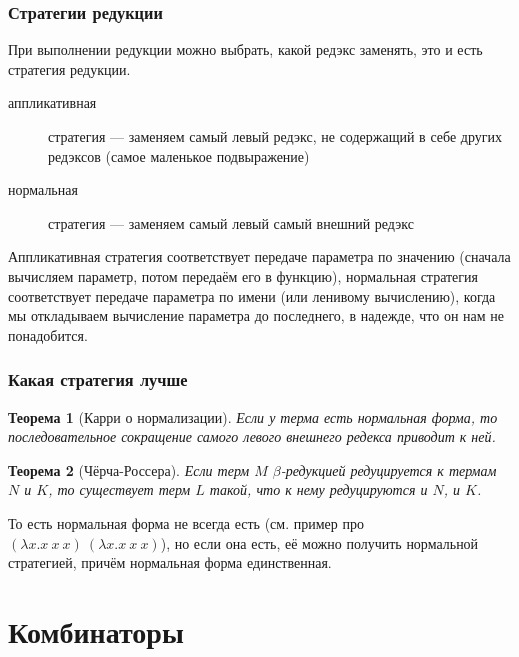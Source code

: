 \documentclass[xetex,mathserif,serif]{beamer}
\newtheorem{rustheorem}{Теорема}
\begin{document}
    \begin{frame}
        \frametitle{Стратегии редукции}
        При выполнении редукции можно выбрать, какой редэкс заменять, это и есть стратегия редукции.
        \begin{description}
            \item[аппликативная] стратегия --- заменяем самый левый редэкс, не содержащий в себе других 
                    редэксов (самое маленькое подвыражение)
            \item[нормальная] стратегия --- заменяем самый левый самый внешний редэкс
        \end{description}
        Аппликативная стратегия соответствует передаче параметра по значению (сначала вычисляем параметр, потом 
        передаём его в функцию), нормальная стратегия соответствует передаче параметра по имени (или ленивому вычислению),
        когда мы откладываем вычисление параметра до последнего, в надежде, что он нам не понадобится.
    \end{frame}

    \begin{frame}
        \frametitle{Какая стратегия лучше}
        \begin{rustheorem}[Карри о нормализации]
            Если у терма есть нормальная форма, то последовательное сокращение самого левого внешнего 
            редекса приводит к ней.
        \end{rustheorem}
        \begin{rustheorem}[Чёрча-Россера]
            Если терм $M$ $\beta$-редукцией редуцируется к термам $N$ и $K$, то существует терм $L$ такой, что
            к нему редуцируются и $N$, и $K$.
        \end{rustheorem}
        \vspace{1cm}
        То есть нормальная форма не всегда есть (см. пример про $(\lambda x.x\ x\ x)\ (\lambda x.x\ x\ x)$), но
        если она есть, её можно получить нормальной стратегией, причём нормальная форма единственная.
    \end{frame}

    \section{Комбинаторы}
\end{document}
